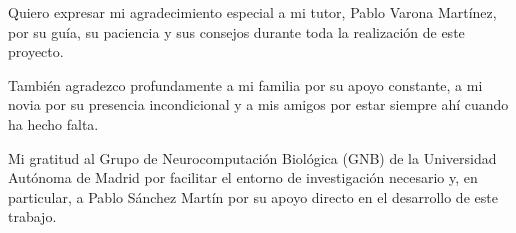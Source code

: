 
Quiero expresar mi agradecimiento especial a mi tutor, Pablo Varona Martínez, por su guía, su paciencia y sus consejos durante toda la realización de este proyecto.

También agradezco profundamente a mi familia por su apoyo constante, a mi novia por su presencia incondicional y a mis amigos por estar siempre ahí cuando ha hecho falta.

Mi gratitud al Grupo de Neurocomputación Biológica (GNB) de la Universidad Autónoma de Madrid por facilitar el entorno de investigación necesario y, en particular, a Pablo Sánchez Martín por su apoyo directo en el desarrollo de este trabajo.
